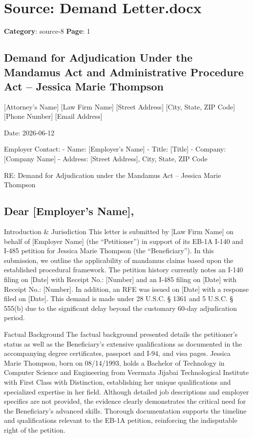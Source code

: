 \section*{Source: Demand Letter.docx}
\textbf{Category}: source-8
\textbf{Page}: 1

\subsection*{Demand for Adjudication Under the Mandamus Act and Administrative Procedure Act – Jessica Marie Thompson}

[Attorney’s Name]
[Law Firm Name]
[Street Address]
[City, State, ZIP Code]
[Phone Number]
[Email Address]

Date: 2026-06-12

Employer Contact:
- Name: [Employer’s Name]
- Title: [Title]
- Company: [Company Name]
- Address: [Street Address], City, State, ZIP Code

RE: Demand for Adjudication under the Mandamus Act – Jessica Marie Thompson

\subsection*{Dear [Employer’s Name],}

Introduction \& Jurisdiction
This letter is submitted by [Law Firm Name] on behalf of [Employer Name] (the “Petitioner”) in support of its EB-1A I-140 and I-485 petition for Jessica Marie Thompson (the “Beneficiary”). In this submission, we outline the applicability of mandamus claims based upon the established procedural framework. The petition history currently notes an I-140 filing on [Date] with Receipt No.: [Number] and an I-485 filing on [Date] with Receipt No.: [Number]. In addition, an RFE was issued on [Date] with a response filed on [Date]. This demand is made under 28 U.S.C. § 1361 and 5 U.S.C. § 555(b) due to the significant delay beyond the customary 60-day adjudication period.

Factual Background
The factual background presented details the petitioner’s status as well as the Beneficiary’s extensive qualifications as documented in the accompanying degree certificates, passport and I-94, and visa pages. Jessica Marie Thompson, born on 08/14/1993, holds a Bachelor of Technology in Computer Science and Engineering from Veermata Jijabai Technological Institute with First Class with Distinction, establishing her unique qualifications and specialized expertise in her field. Although detailed job descriptions and employer specifics are not provided, the evidence clearly demonstrates the critical need for the Beneficiary’s advanced skills. Thorough documentation supports the timeline and qualifications relevant to the EB-1A petition, reinforcing the indisputable right of the petition.

